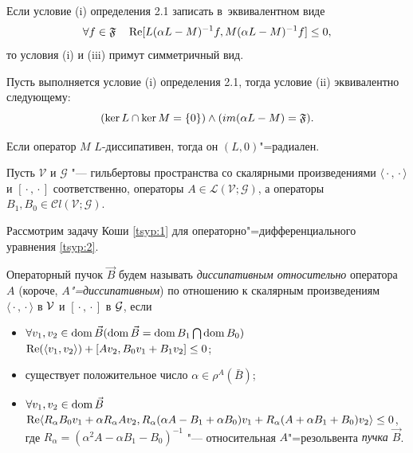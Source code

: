\smallskip

\begin{remark}[2.1]  Если условие (i) определения 2.1 записать в~эквивалентном виде
$$\forall f\in \frak F \quad \mathop{\rm Re}[L(\alpha L-M)^{-1}f,M(\alpha
L-M)^{-1}f]\leq 0,$$ то условия (i) и (iii) примут симметричный
вид.
\end{remark}

\smallskip

\begin{lemma}[2.1]Пусть выполняется условие {\rm(i)} определения
{\rm2.1,} тогда условие {\rm (ii)} эквивалентно следующему\/{\rm :} $$(\mathop{\rm ker} L\cap \mathop{\rm ker}
M=\{0\})\wedge (im(\alpha L-M)= \frak F).$$
\end{lemma}

\smallskip

\begin{theorem}[2.1]Если оператор $M$ $L$-диссипативен{\rm ,} тогда он {$(L, 0)$"=радиален{\rm .}}
\end{theorem}

\smallskip

Пусть $\mathcal V$ и $\mathcal G$ "--- гильбертовы пространства со скалярными произведениями $\langle{}\cdot{}, {}\cdot{}\rangle$ и $[{}\cdot{}, {}\cdot{}]$ соответственно, 
операторы $A \in \mathcal L (\mathcal V;\mathcal G)$, а операторы \mbox{$B_{1},B_{0} \in \mathcal Cl (\mathcal V;\mathcal G)$.}

Рассмотрим задачу Коши \eqref{tsyp:1} для операторно"=дифференциального уравнения \eqref{tsyp:2}.

\smallskip

\begin{definition}[2.2]Операторный пучок $\vec{B}$ будем называть \emph{диссипативным относительно} оператора $A$ (короче,
\emph{$A$"=диссипативным}\/)  по отношению к скалярным произведениям $\langle{}\cdot{}, {}\cdot{}\rangle$ в $\cal V$ и $[{}\cdot{}, {}\cdot{}]$ в $\cal G$, если
\begin{itemize}
\item[(i)] $\forall v_{1},v_{2}\in \mathop{\rm \mathop{\rm dom}}\vec{B} (\mathop{\rm \mathop{\rm dom}}\vec{B}=\mathop{\rm \mathop{\rm dom}}B_{1}\bigcap
\mathop{\rm \mathop{\rm dom}}B_{0})$ $\mathop{\rm Re}(\langle
v_{1},v_{2}\rangle)+[Av_{2},B_{0}v_{1}+B_{1}v_{2}]\leq0$;
\item[(ii)] существует положительное число $\alpha \in
\rho^{A}(\bar{B})$;
\item[(iii)] $\forall v_{1},v_{2} \in  \mathop{\rm dom}\vec{B}$ $\mathop{\rm Re} \langle
R_{\alpha} B_{0} v_{1}+\alpha R_{\alpha} A v_{2},R_{\alpha}
(\alpha A-B_{1}+\alpha B_{0}) v_{1}+R_{\alpha} ( A+\alpha B_{1}+
B_{0})v_{2} \rangle \leq 0$, где  $ R_{\alpha}=(\alpha^{2}
A-\alpha B_{1}-B_{0})^{-1}$ "--- относительная
$A$"=резольвента \emph{пучка $\vec{B}$}.
\end{itemize}
\end{definition}

